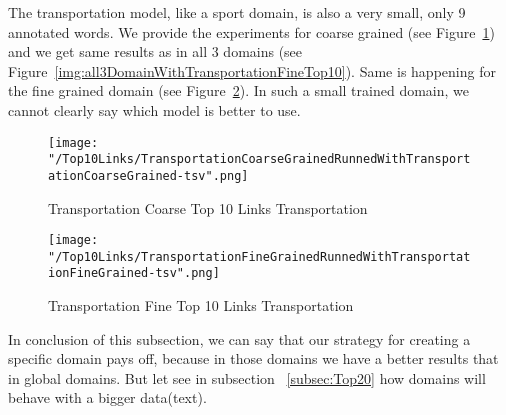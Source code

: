 \documentclass[thesis=M,english]{FITthesis}[2018/05/30]
\begin{document}
	The transportation model, like a sport domain, is also a very small, only 9 annotated words. We provide the experiments for coarse grained (see Figure~\ref{img:TransportationtWithTransportationCoarseTop10}) and we get same results as in all 3 domains (see Figure~\ref{img:all3DomainWithTransportationFineTop10}). Same is happening for the fine grained domain (see Figure~\ref{img:TransportationWithTransportationFineTop10}). In such a small trained domain, we cannot clearly say which model is better to use.
	\begin{figure}[H]\centering
		\texttt{[image: "/Top10Links/TransportationCoarseGrainedRunnedWithTransportationCoarseGrained-tsv".png]}
		\caption{Transportation Coarse Top 10 Links Transportation}\label{img:TransportationtWithTransportationCoarseTop10}
	\end{figure}		
	
	\begin{figure}[H]\centering
		\texttt{[image: "/Top10Links/TransportationFineGrainedRunnedWithTransportationFineGrained-tsv".png]}
		\caption{Transportation Fine Top 10 Links Transportation}\label{img:TransportationWithTransportationFineTop10}
	\end{figure}
	
	In conclusion of this subsection, we can say that our strategy for creating a specific domain pays off, because in those domains we have a better results that in global domains. But let see in subsection ~\ref{subsec:Top20} how domains will behave with a bigger data(text).
\end{document}
